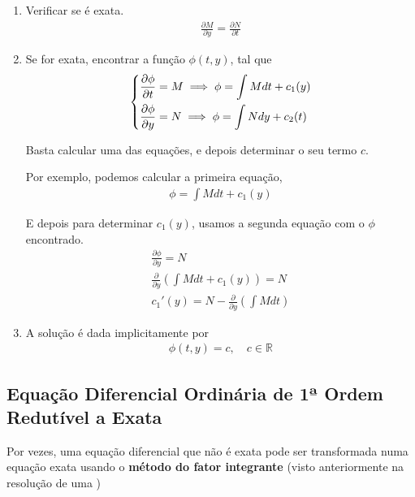 \documentclass{article}
\begin{document}
\begin{enumerate}
    \item Verificar se é exata.
    \begin{gather*}
    \frac{\partial M}{\partial y} = \frac{\partial N}{\partial t}
    \end{gather*}
    
    \item Se for exata, encontrar a função $\phi(t,y)$, tal que
    \begin{gather*}
    \begin{dcases}
    \frac{\partial \phi}{\partial t} = M \implies \phi = \int M dt + c_1(y) \\
    \frac{\partial \phi}{\partial y} = N \implies \phi = \int N dy + c_2(t)
    \end{dcases}
    \end{gather*}
    
    Basta calcular uma das equações, e depois determinar o seu termo $c$.
    
    Por exemplo, podemos calcular a primeira equação,
    \begin{gather*}
    \phi = \int M dt + c_1(y)
    \end{gather*}

    E depois para determinar $c_1(y)$, usamos a segunda equação com o $\phi$ encontrado.
    \begin{gather*}
    \frac{\partial \phi}{\partial y} = N \\
    \frac{\partial }{\partial y} \left( \int M dt + c_1(y) \right) = N \\
    c_1'(y) = N - \frac{\partial }{\partial y} \left( \int M dt \right)
    \end{gather*}

    \item A solução é dada implicitamente por
    \begin{gather*}
    \phi(t,y) = c, \quad c \in \mathbb{R}
    \end{gather*}
\end{enumerate}

\bigskip

\subsection{Equação Diferencial Ordinária de 1ª Ordem Redutível a Exata}

Por vezes, uma equação diferencial que não é exata pode ser transformada numa equação exata 
usando o \textbf{método do fator integrante} (visto anteriormente na resolução de uma )
\end{document}
